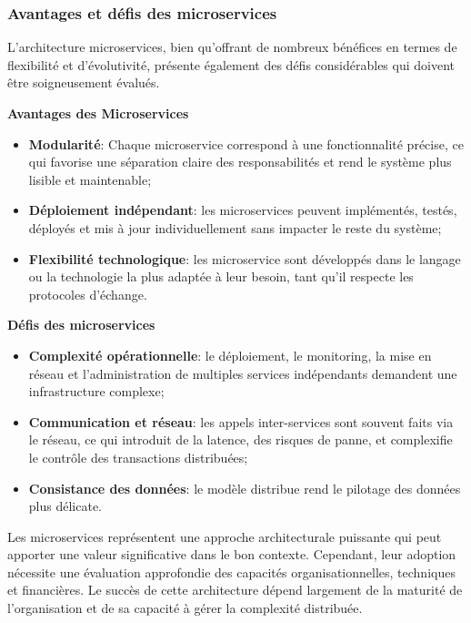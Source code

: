 \subsubsection{Avantages et défis des microservices}

L'architecture microservices, bien qu'offrant de nombreux bénéfices en termes de flexibilité et d'évolutivité, présente également des défis considérables qui doivent être soigneusement évalués.

\textbf{Avantages des Microservices}

\begin{itemize}
    \item \textbf{Modularité}: Chaque microservice correspond à une fonctionnalité précise, ce qui favorise une séparation claire des responsabilités et rend le système plus lisible et maintenable; 

    \item \textbf{Déploiement indépendant}: les microservices peuvent implémentés, testés, déployés et mis à jour individuellement sans impacter le reste du système;
    
    \item \textbf{Flexibilité technologique}: les microservice sont développés dans le langage ou la technologie la plus adaptée à leur besoin, tant qu’il respecte les protocoles d’échange.
\end{itemize}

\textbf{Défis des microservices}

\begin{itemize}
    \item \textbf{Complexité opérationnelle}: le déploiement, le monitoring, la mise en réseau et l'administration de multiples services indépendants demandent une infrastructure complexe;
    
    \item \textbf{Communication et réseau}: les appels inter-services sont souvent faits via le réseau, ce qui introduit de la latence, des risques de panne, et complexifie le contrôle des transactions distribuées;

    \item \textbf{Consistance des données}: le modèle distribue rend le pilotage des données plus délicate.
\end{itemize}

Les microservices représentent une approche architecturale puissante qui peut apporter une valeur significative dans le bon contexte. Cependant, leur adoption nécessite une évaluation approfondie des capacités organisationnelles, techniques et financières. Le succès de cette architecture dépend largement de la maturité de l'organisation et de sa capacité à gérer la complexité distribuée.

